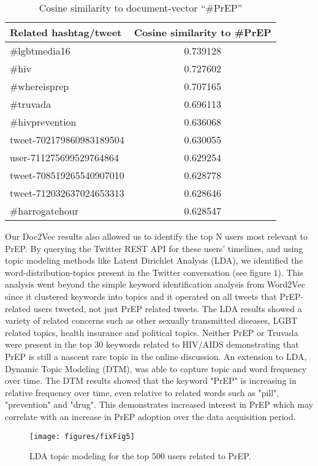 \begin{table}
\centering
\caption{Cosine similarity to document-vector ``\#PrEP''}
\begin{tabular}{|l|c|} \hline
Related hashtag/tweet & Cosine similarity to \#PrEP\\ \hline
\#lgbtmedia16 & 0.739128\\ \hline
\#hiv & 	0.727602 \\ \hline
\#whereisprep & 0.707165 \\ \hline
\#truvada & 0.696113 \\ \hline
\#hivprevention & 0.636068 \\ \hline
tweet-702179860983189504 & 0.630055\\ \hline
user-711275699529764864 & 0.629254\\ \hline
tweet-708519265540907010 & 0.628778 \\ \hline
tweet-712032637024653313 & 0.628646 \\ \hline
\#harrogatehour & 0.628547 \\ \hline
\hline\end{tabular}
\label{tbl:d2v}
\end{table}

Our Doc2Vec results also allowed us to identify the top N users most relevant to PrEP. By querying the Twitter REST API for these users' timelines, and using topic modeling methods like Latent Dirichlet Analysis (LDA), we identified the word-distribution-topics present in the Twitter conversation (see figure 1). This analysis went beyond the simple keyword identification analysis from Word2Vec since it clustered keywords into topics and it operated on all tweets that PrEP-related users tweeted, not just PrEP related tweets. The LDA results showed a variety of related concerns such as other sexually transmitted diseases, LGBT related topics, health insurance and political topics. Neither PrEP or Truvada were present in the top 30 keywords related to HIV/AIDS demonstrating that PrEP is still a nascent rare topic in the online discussion. An extension to LDA, Dynamic Topic Modeling (DTM), was able to capture topic and word frequency over time. The DTM results showed that the keyword "PrEP" is increasing in relative frequency over time, even relative to related words such as "pill", "prevention" and "drug". This demonstrates increased interest in PrEP which may correlate with an increase in PrEP adoption over the data acquisition period.

\begin{figure*}
\centering
\texttt{[image: figures/fixFig5]}
\caption{LDA topic modeling for the top 500 users related to PrEP.}
\label{fig:lda}
\end{figure*}

